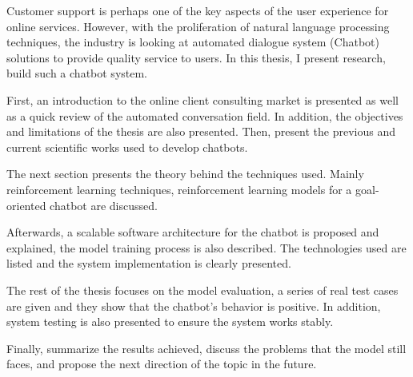 \documentclass[12pt,a4paper,oneside]{book} %
\begin{document}
\begin{abstractTA}

Customer support is perhaps one of the key aspects of the user experience for online services. However, with the proliferation of natural language processing techniques, the industry is looking at automated dialogue system (Chatbot) solutions to provide quality service to users. In this thesis, I present research, build such a chatbot system.

First, an introduction to the online client consulting market is presented as well as a quick review of the automated conversation field. In addition, the objectives and limitations of the thesis are also presented. Then, present the previous and current scientific works used to develop chatbots.

The next section presents the theory behind the techniques used. Mainly reinforcement learning techniques, reinforcement learning models for a goal-oriented chatbot are discussed.

Afterwards, a scalable software architecture for the chatbot is proposed and explained, the model training process is also described. The technologies used are listed and the system implementation is clearly presented.

The rest of the thesis focuses on the model evaluation, a series of real test cases are given and they show that the chatbot's behavior is positive. In addition, system testing is also presented to ensure the system works stably.

Finally, summarize the results achieved, discuss the problems that the model still faces, and propose the next direction of the topic in the future.

\end{abstractTA}	
\end{document}
